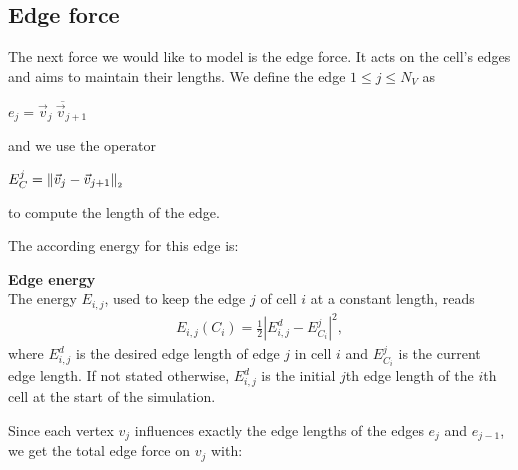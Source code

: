     
\subsection{Edge force}
The next force we would like to model is the edge force. 
It acts on the cell's edges and aims to maintain their lengths.
We define the edge $1 \leq j \leq N_V$ as 
\begin{center}
	$
	e_j = \overline{\vec{v}_j \: \vec{v}_{j+1}}
	$
\end{center}
and we use the operator 
\begin{center}
	$
	E^j_C = \norm[\vec{v}_j - \vec{v}_{j+1}]
	$
\end{center}
to compute the length of the edge. 

The according energy for this edge is:
\begin{definition} \textbf{Edge energy} \\
	The energy $E_{i,j}$, used to keep the edge $j$ of cell $i$ at a constant length, reads 
	\begin{align}
		E_{i,j}(C_i) = \frac{1}{2} | E_{i,j}^d - E^j_{C_i}|^2, \label{eq:edgeEnergy} 
	\end{align}
	where $E_{i,j}^d$ is the desired edge length of edge $j$ in cell $i$ and $E^j_{C_i}$ is the current edge length. 
	If not stated otherwise, $E_{i,j}^d$ is the initial $j$th edge length of the $i$th cell at the start of the simulation. 
\end{definition}

Since each vertex $v_j$ influences exactly the edge lengths of the edges $e_{j}$ and $e_{j-1}$, we get the total edge force on $v_j$ with: 


